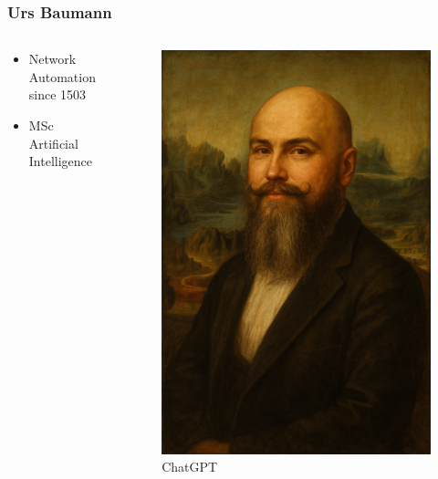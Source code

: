 \documentclass[aspectratio=169]{beamer}
\begin{document}
\begin{frame}[fragile]
  \frametitle{Urs Baumann}

  \begin{columns}
    \begin{column}{0.6\textwidth}
      \begin{itemize}
        \setlength\itemsep{1em}
        \item Network Automation since 1503
        \item MSc Artificial Intelligence
      \end{itemize}
    \end{column}
    \begin{column}{0.4\textwidth}
      \begin{figure}
        \includegraphics[height = 0.7\textheight]{images/urs_monalisa.png}
        \caption{\footnotesize ChatGPT}
      \end{figure}
    \end{column}
  \end{columns} 
      


\end{frame}
\end{document}

